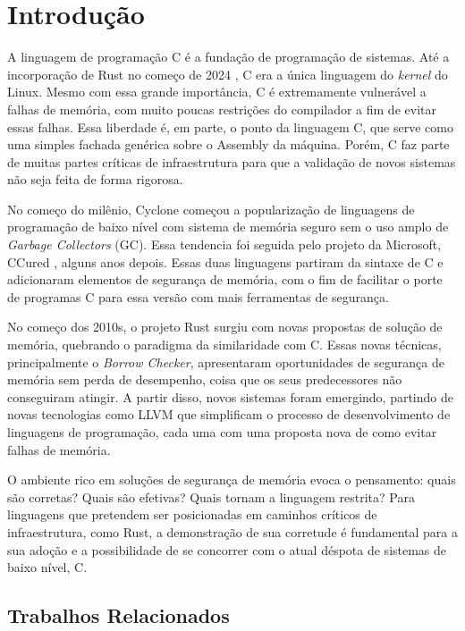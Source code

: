 \chapter{Introdução}

A linguagem de programação C \cite{CLANG} é a fundação de programação de sistemas. Até a incorporação de Rust no começo de 2024 \cite{RUSTFORLINUX}, C era a única linguagem do \emph{kernel} do Linux. Mesmo com essa grande importância, C é extremamente vulnerável a falhas de memória, com muito poucas restrições do compilador a fim de evitar essas falhas. Essa liberdade é, em parte, o ponto da linguagem C, que serve como uma simples fachada genérica sobre o Assembly da máquina. Porém, C faz parte de muitas partes críticas de infraestrutura para que a validação de novos sistemas não seja feita de forma rigorosa. 

No começo do milênio, Cyclone \cite{CYCLONE1} começou a popularização de linguagens de programação de baixo nível com sistema de memória seguro sem o uso amplo de \emph{Garbage Collectors} (GC). Essa tendencia foi seguida pelo projeto da Microsoft, CCured \cite{CCURED}, alguns anos depois. Essas duas linguagens partiram da sintaxe de C e adicionaram elementos de segurança de memória, com o fim de facilitar o porte de programas C para essa versão com mais ferramentas de segurança.

No começo dos 2010s, o projeto Rust \cite{RUSTBOOK} surgiu com novas propostas de solução de memória, quebrando o paradigma da similaridade com C. Essas novas técnicas, principalmente o \emph{Borrow Checker}, apresentaram oportunidades de segurança de memória sem perda de desempenho, coisa que os seus predecessores não conseguiram atingir. A partir disso, novos sistemas foram emergindo, partindo de novas tecnologias como LLVM \cite{LLVM} que simplificam o processo de desenvolvimento de linguagens de programação, cada uma com uma proposta nova de como evitar falhas de memória.

O ambiente rico em soluções de segurança de memória evoca o pensamento: quais são corretas? Quais são efetivas? Quais tornam a linguagem restrita? Para linguagens que pretendem ser posicionadas em caminhos críticos de infraestrutura, como Rust, a demonstração de sua corretude é fundamental para a sua adoção e a possibilidade de se concorrer com o atual déspota de sistemas de baixo nível, C.

\section{Trabalhos Relacionados}


